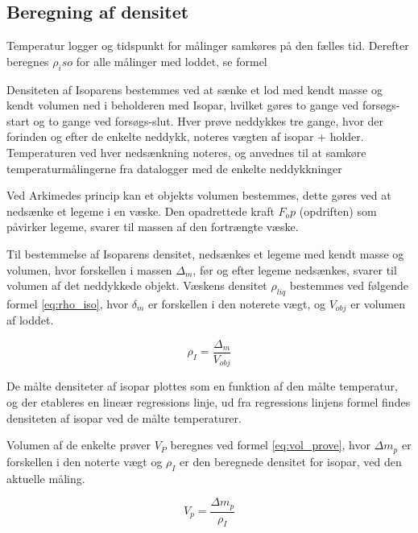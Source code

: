 \subsection{Beregning af densitet} 
Temperatur logger og tidspunkt for målinger samkøres på den fælles tid. 
Derefter beregnes $\rho_iso$ for alle målinger med loddet, se formel 

Densiteten af Isoparens bestemmes ved at sænke et lod med kendt masse og kendt volumen ned i beholderen med Isopar, hvilket gøres to gange ved forsøgs-start og to gange ved forsøgs-slut. Hver prøve neddykkes tre gange, hvor der forinden og efter de enkelte neddykk, noteres vægten af isopar + holder. Temperaturen ved hver nedsænkning noteres, og anvednes til at samkøre temperaturmålingerne fra datalogger med de enkelte neddykkninger

Ved Arkimedes princip kan et objekts volumen bestemmes, dette gøres ved at nedsænke et legeme i en væske. Den opadrettede kraft $F_op$ (opdriften) som påvirker legeme, svarer til massen af den fortrængte væske.

Til bestemmelse af Isoparens densitet, nedsænkes et legeme med kendt masse og volumen, hvor forskellen i massen $\Delta_m$, før og efter legeme nedsænkes, svarer til volumen af det neddykkede objekt. Væskens densitet $\rho_{liq}$ bestemmes ved følgende formel \vref{eq:rho_iso}, hvor $\delta_m$ er forskellen i den noterete vægt, og $V_{obj}$ er volumen af loddet.     

%
\begin{equation}
\label{eq:rho_iso}
\rho_{I}=\frac{\Delta{_m}}{V_{obj}}  
\end{equation}
% 

De målte densiteter af isopar plottes som en funktion af den målte temperatur, og der etableres en lineær regressions linje, ud fra regressions linjens formel findes densiteten af isopar ved de målte temperaturer. 

Volumen af de enkelte prøver $V_P$ beregnes ved formel \vref{eq:vol_prove}, hvor $\Delta{m_p}$ er forskellen i den noterte vægt og $\rho_I$ er den beregnede densitet for isopar, ved den aktuelle måling.

%
\begin{equation}
\label{eq:vol_prove}
V_p=\frac{\Delta{m_p}}{\rho_I}
\end{equation}
%

